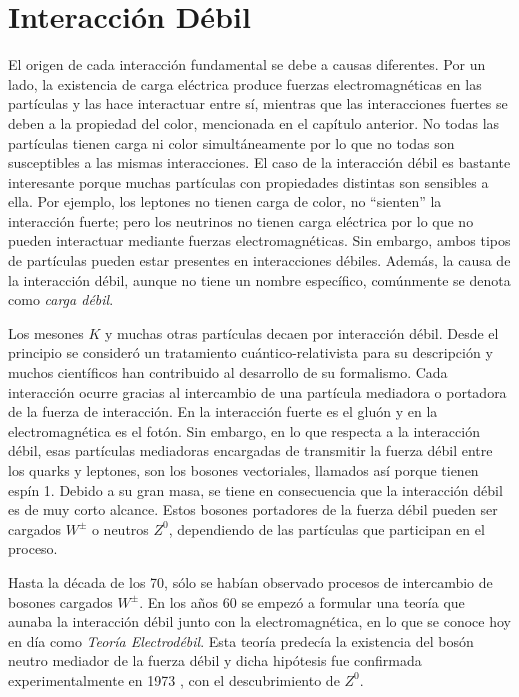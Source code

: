 \chapter{Interacción Débil}\label{cap:weak_int}

El origen de cada interacción fundamental se debe a causas diferentes. Por un lado, la existencia de carga eléctrica produce fuerzas electromagnéticas en las partículas y las hace interactuar entre sí, mientras que las interacciones fuertes se deben a la propiedad del color, mencionada en el capítulo anterior. No todas las partículas tienen carga ni color simultáneamente por lo que no todas son susceptibles a las mismas interacciones. El caso de la interacción débil es bastante interesante porque muchas partículas con propiedades distintas son sensibles a ella. Por ejemplo, los leptones no tienen carga de color, no ``sienten'' la interacción fuerte; pero los neutrinos no tienen carga eléctrica por lo que no pueden interactuar mediante fuerzas electromagnéticas. Sin embargo, ambos tipos de partículas pueden estar presentes en interacciones débiles.\cite{Griffiths2008} Además, la causa de la interacción débil, aunque no tiene un nombre específico, comúnmente se denota como \textit{carga débil}.

Los mesones $K$ y muchas otras partículas decaen por interacción débil. Desde el principio se consideró un tratamiento cuántico-relativista para su descripción y muchos científicos han contribuido al desarrollo de su formalismo. Cada interacción ocurre gracias al intercambio de una partícula mediadora o portadora de la fuerza de interacción. En la interacción fuerte es el gluón y en la electromagnética es el fotón. Sin embargo, en lo que respecta a la interacción débil, esas partículas mediadoras encargadas de transmitir la fuerza débil entre los quarks y leptones, son los bosones vectoriales, llamados así porque tienen espín 1. Debido a su gran masa, se tiene en consecuencia que la interacción débil es de muy corto alcance. Estos bosones portadores de la fuerza débil pueden ser cargados $W^{\pm}$ o neutros $Z^0$, dependiendo de las partículas que participan en el proceso. 

Hasta la década de los 70, sólo se habían observado procesos de intercambio de bosones cargados $W^{\pm}$. En los años 60 se empezó a formular una teoría que aunaba la interacción débil junto con la electromagnética, en lo que se conoce hoy en día como \textit{Teoría Electrodébil}. Esta teoría predecía la existencia del bosón neutro mediador de la fuerza débil y dicha hipótesis fue confirmada experimentalmente en 1973 \cite{BrianM}, con el descubrimiento de $Z^0$.

